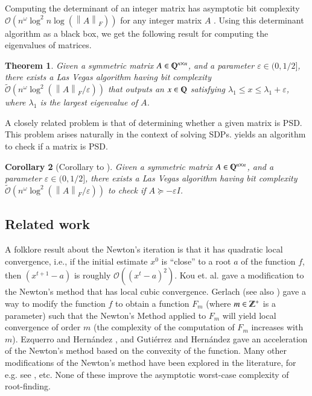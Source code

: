 \documentclass{article}[12pt]
\newtheorem{theorem}{Theorem}[section]
\newtheorem{corollary}[theorem]{Corollary}
\theoremstyle{definition}
\renewcommand{\mathbb}{\varmathbb}
\renewcommand{\leq}{\leqslant}
\renewcommand{\le}{\leqslant}
\newcommand{\paren}[1]{\left(#1 \right )}
\newcommand{\norm}[1]{\left\lVert#1\right\rVert}
\newcommand{\fnorm}[1]{\norm{#1}_F}
\newcommand{\Z}{{\mathbb Z}}
\newcommand{\Q}{\mathbb Q}
\newcommand{\e}{\epsilon}
\let\e\varepsilon
\newcommand{\etal}{et. al.}
\newcommand{\bigO}{\mathcal{O}}
\newcommand{\bigo}[1]{\bigO\left(#1\right)}
\newcommand{\tbigO}{\tilde{\mathcal{O}}}
\newcommand{\tbigo}[1]{\tbigO\left(#1\right)}
\begin{document}
Computing the determinant of an integer matrix has asymptotic bit complexity 
$\bigo{n^{\omega} \log^2 n \log (\fnorm{A})}$ for any integer matrix $A$ \cite{s05}. 
Using this determinant algorithm as a black box,
we get the following result for computing the eigenvalues of matrices.
\begin{theorem}
\label{thm:main}
Given a symmetric matrix $A \in \Q^{n \times n}$, and a
parameter $\e \in (0,1/2]$, there exists a Las Vegas algorithm having bit complexity 
$\tbigo{n^{\omega} \log^2 \paren{\fnorm{A}/\e}}$ 
that outputs an $x \in \Q$ satisfying
$\lambda_1 \leq x \le \lambda_1 + \e$,
where $\lambda_1$ is the largest eigenvalue of $A$. 
\end{theorem}
A closely related problem is that of determining whether a given matrix is PSD. This 
problem arises naturally in the context of solving SDPs.  yields
an algorithm to check if a matrix is PSD.
\begin{corollary}[Corollary to ]
Given a symmetric matrix $A \in \Q^{n \times n}$, and a
parameter $\e \in (0,1/2]$, there exists a Las Vegas algorithm having bit complexity 
$\tbigo{n^{\omega} \log^2 \paren{\fnorm{A}/\e}}$ 
to check if $A \succeq -\e I$.
\end{corollary}



\subsection{Related work}
A folklore result about the Newton's iteration is that it has quadratic local convergence, i.e.,
 if the initial estimate $x^0$ is ``close'' to a root $a$ of the function $f$, 
then $(x^{t+1} - a)$ is roughly $\bigo{\paren{x^t - a}^2}$.  
Kou \etal \cite{klw06} gave a modification to the Newton's method that has local cubic convergence.
Gerlach \cite{g94} (see also \cite{fp96,kkz97,kg00}) gave a way to modify the function $f$ 
to obtain a function $F_m$ (where $m \in \Z^+$ is a parameter) such that 
the Newton's Method applied to $F_m$ will yield local convergence of order $m$
(the complexity of the computation of $F_m$ increases with $m$).
Ezquerro and Hern\'{a}ndez \cite{eh99}, and 
Guti{\'e}rrez and Hern\'{a}ndez \cite{gh01} gave an acceleration of the Newton's method 
based on the convexity of the function.
Many other modifications of the Newton's method have been explored in the literature,
for e.g. see \cite{ow08,lr08}, etc. None of these improve the asymptotic worst-case complexity of root-finding.
\end{document}
